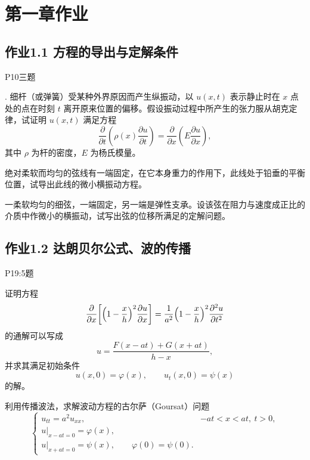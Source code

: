 \chapter{第一章作业}

\section{作业1.1 方程的导出与定解条件}
P10三题
\begin{homework}
[1]. 细杆（或弹簧）受某种外界原因而产生纵振动，以 $u(x,t)$ 表示静止时在 $x$ 点处的点在时刻 $t$ 离开原来位置的偏移。假设振动过程中所产生的张力服从胡克定律，试证明 $u(x,t)$ 满足方程
\[
\frac{\partial}{\partial t}\left(\rho(x)\frac{\partial u}{\partial t}\right)
= \frac{\partial}{\partial x}\left(E\frac{\partial u}{\partial x}\right),
\]
其中 $\rho$ 为杆的密度，$E$ 为杨氏模量。
\end{homework}

\begin{homework}
[6] 绝对柔软而均匀的弦线有一端固定，在它本身重力的作用下，此线处于铅垂的平衡位置，试导出此线的微小横振动方程。
\end{homework}

\begin{homework}
[7] 一柔软均匀的细弦，一端固定，另一端是弹性支承。设该弦在阻力与速度成正比的介质中作微小的横振动，试写出弦的位移所满足的定解问题。
\end{homework}

\section{作业1.2 达朗贝尔公式、波的传播}
P19:5题
\begin{homework}[1]
证明方程
\[
\frac{\partial}{\partial x}\!\left[\Bigl(1-\frac{x}{h}\Bigr)^{2}\frac{\partial u}{\partial x}\right]
= \frac{1}{a^{2}}\Bigl(1-\frac{x}{h}\Bigr)^{2}\frac{\partial^{2}u}{\partial t^{2}}
\]
的通解可以写成
\[
u = \frac{F(x-at)+G(x+at)}{h-x},
\]
并求其满足初始条件
\[
u(x,0)=\varphi(x),\qquad u_t(x,0)=\psi(x)
\]
的解。
\end{homework}

\begin{homework}
[3] 利用传播波法，求解波动方程的古尔萨（Goursat）问题
\[
\begin{cases}
u_{tt}=a^{2}u_{xx}, & -at<x<at,\ t>0,\\[4pt]
u|_{x-at=0}=\varphi(x),\\[4pt]
u|_{x+at=0}=\psi(x),\qquad \varphi(0)=\psi(0).
\end{cases}
\]
\end{homework}

